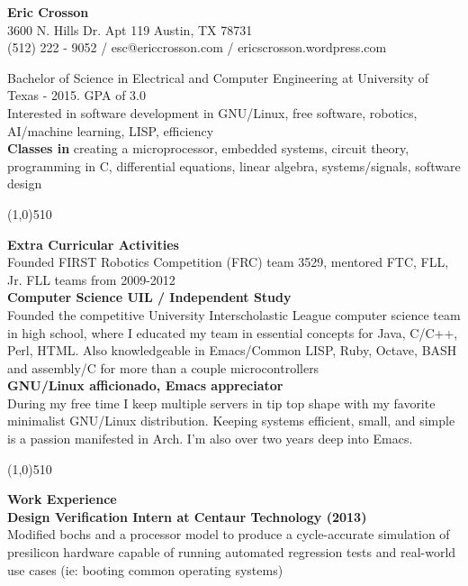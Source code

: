 \documentclass{report}
\newcommand{\cut}{\begin{center} \line(1,0){510} \end{center}}
\begin{document}
\pagestyle{empty}
\setlength\parindent{0pt}

\begin{center}
  \textbf{Eric Crosson} \\
  3600 N. Hills Dr. Apt 119 Austin, TX 78731 \\
  (512) 222 - 9052 / esc@ericcrosson.com / ericscrosson.wordpress.com\\
\end{center}

Bachelor of Science in Electrical and Computer Engineering at
University of Texas - 2015. GPA of 3.0 \\
Interested in software development in GNU/Linux, free software, robotics,
AI/machine learning, LISP, efficiency \\

\textbf{Classes in}
creating a microprocessor, embedded systems, circuit theory,
programming in C, differential equations, linear algebra, systems/signals, software design

\cut{}

\textbf{Extra Curricular Activities} \\
Founded FIRST Robotics Competition (FRC) team 3529, mentored
FTC, FLL, Jr. FLL teams from 2009-2012 \\

\textbf{Computer Science UIL / Independent Study} \\
Founded the competitive University Interscholastic League computer
science team in high school, where I educated my team in essential
concepts for Java, C/C++, Perl, HTML. Also knowledgeable in
Emacs/Common LISP, Ruby, Octave, BASH and assembly/C for
more than a couple microcontrollers \\

\textbf{GNU/Linux afficionado, Emacs appreciator} \\
During my free time I keep multiple servers in tip top shape with my
favorite minimalist GNU/Linux distribution. Keeping systems
efficient, small, and simple is a passion manifested in Arch. I'm also
over two years deep into Emacs.

\cut{}

\textbf{Work Experience} \\
\textbf{Design Verification Intern at Centaur Technology (2013)} \\
Modified bochs and a processor model to produce a cycle-accurate
simulation of presilicon hardware capable of running automated
regression tests and real-world use cases (ie: booting common
operating systems) \\
\end{document}
